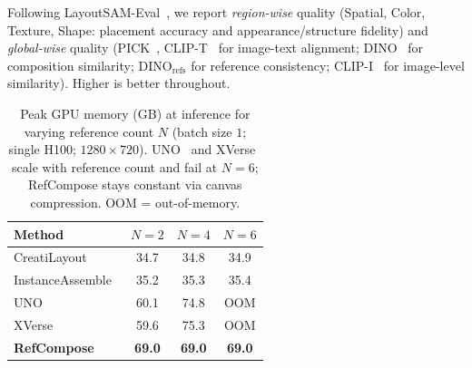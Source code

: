 \documentclass[runningheads]{llncs}
\begin{document}
Following LayoutSAM-Eval~\cite{xiang2025instanceassemble}, we report \emph{region-wise} quality (Spatial, Color, Texture, Shape: placement accuracy and appearance/structure fidelity) and \emph{global-wise} quality (PICK~\cite{kirstain2023pickapic}, CLIP-T~\cite{radford2021clip} for image-text alignment; DINO~\cite{caron2021dino} for composition similarity; DINO$_{\text{refs}}$ for reference consistency; CLIP-I~\cite{radford2021clip} for image-level similarity). Higher is better throughout.

\begin{table}[t]
  \centering
  \caption{Peak GPU memory (GB) at inference for varying reference count $N$ (batch size $1$; single H100; $1280 \times 720$). UNO~\cite{wu2025uno} and XVerse~\cite{xverse2024} scale with reference count and fail at $N{=}6$; RefCompose stays constant via canvas compression. OOM = out-of-memory.}
  \label{tab:memory}
  \setlength{\tabcolsep}{5pt}
  \begin{tabular}{lccc}
    \toprule
    \textbf{Method} & $N{=}2$ & $N{=}4$ & $N{=}6$ \\
    \midrule
    CreatiLayout~\cite{tang2024creatilayout} & 34.7 & 34.8 & 34.9 \\
    InstanceAssemble~\cite{xiang2025instanceassemble} & 35.2 & 35.3 & 35.4 \\
    UNO~\cite{wu2025uno} & 60.1 & 74.8 & OOM \\
    XVerse~\cite{xverse2024} & 59.6 & 75.3 & OOM \\
    \midrule
    \textbf{RefCompose} & \textbf{69.0} & \textbf{69.0} & \textbf{69.0} \\
    \bottomrule
  \end{tabular}
\end{table}
\end{document}
